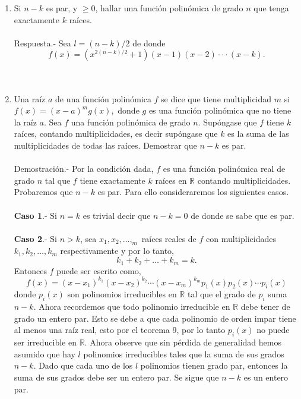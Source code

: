 \begin{enumerate}[\bfseries 1.]
\begin{enumerate}[\bfseries (a)]
	\item Si $n-k$ es par, y $\geq 0$, hallar una función polinómica de grado $n$ que tenga exactamente $k$ raíces.\\\\
	    Respuesta.-\; Sea $l = (n-k)/2$ de donde 
	    $$f(x) = (x^{2(n-k)/2} + 1)(x-1)(x-2)\cdot \cdot \cdot (x-k).$$\\\\
	
	\item Una raíz $a$ de una función polinómica $f$ se dice que tiene multiplicidad $m$ si $f(x)=(x-a)^m g(x),$ donde $g$ es una función polinómica que no tiene la raíz $a$. Sea $f$ una función polinómica de grado $n$. Supóngase que $f$ tiene $k$ raíces, contando multiplicidades, es decir supóngase que $k$ es la suma de las multiplicidades de todas las raíces. Demostrar que $n-k$ es par.\\\\
	    Demostración.-\; Por la condición dada, $f$ es una función polinómica real de grado $n$ tal que $f$ tiene exactamente $k$ raíces en $\mathbb{R}$ contando multiplicidades. Probaremos que $n-k$ es par. Para ello consideraremos los siguientes casos.\\\\
	    \textbf{Caso 1}.- Si $n=k$ es trivial decir que $n-k=0$ de donde se sabe que es par.\\\\
	    \textbf{Caso 2}.- Si $n>k$, sea $x_1,x_2,\ldots , _m$ raíces reales de $f$ con multiplicidades $k_1,k_2,\ldots, k_m$ respectivamente y por lo tanto,
	    $$k_1 + k_2 + \ldots + k_m = k.$$
	    Entonces $f$ puede ser escrito como,
	    $$f(x) = (x-x_1)^{k_1}(x-x_2)^{k_2}\cdots (x-x_m)^{k_m}p_1(x)p_2(x)\cdots p_i(x)$$
	    donde $p_i(x)$ son polinomios irreducibles en $\mathbb{R}$ tal que el grado de $p_i$  suma $n-k$. Ahora recordemos que todo polinomio irreducible en $\mathbb{R}$ debe tener de grado un entero par. Esto se debe a que cada polinomio de orden impar tiene al menos una raíz real, esto por el teorema 9, por lo tanto $p_i(x)$ no puede ser irreducible en $\mathbb{R}$. Ahora observe que sin pérdida de generalidad hemos asumido que hay $l$ polinomios irreducibles tales que la suma de sus grados $n-k$. Dado que cada uno de los $l$ polinomios tienen grado par, entonces la suma de sus grados debe ser un entero par. Se sigue que $n-k$ es un entero par.\\\\ 


\end{enumerate}
\end{enumerate}
